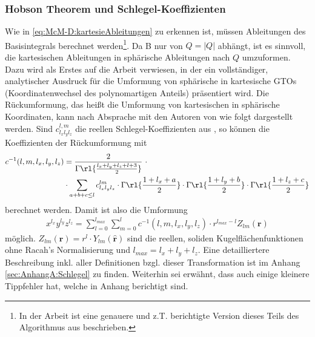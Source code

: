 \subsubsection{Hobson Theorem und 
Schlegel-Koeffizienten}\label{sec:Hobson_schlegel}
%
Wie in \ref{eq:McM-D:kartesieAbleitungen} zu erkennen ist, müssen  
Ableitungen des Basisintegrals berechnet werden\footnote{In der Arbeit 
\cite{av:9a} ist eine genauere und z.T. berichtigte Version dieses Teils des 
Algorithmus aus \cite{av:1a} beschrieben.}. Da B nur von $Q=|Q|$ abhängt, 
ist es sinnvoll, die kartesischen Ableitungen in sphärische Ableitungen nach 
$Q$ umzuformen.\\
Dazu wird als Erstes auf die Arbeit \cite{av:4a} verwiesen, in der ein 
vollständiger, analytischer Ausdruck für die Umformung von sphärische in  
kartesische GTOs (Koordinatenwechsel des polynomartigen Anteils) präsentiert 
wird. Die Rückumformung, das heißt die Umformung von kartesischen in 
sphärische Koordinaten, kann nach Absprache mit den Autoren von \cite{av:1a} 
wie folgt dargestellt werden. Sind $c_{l_xl_yl_z}^{l,m}$ die reellen 
Schlegel-Koeffizienten aus \cite{av:4a}, so können die Koeffizienten der 
Rückumformung mit
%
\begin{align}\nonumber
c^{-1}(l,m,l_x,l_y,l_z)&=\frac{2}{\Gamma\rl{\frac{l_x+l_y+l_z+l+3}{2}}} 
 \ \cdot \\ \label{eq:def:c_koef}
 &\cdot  \sum_{a+b+c\leq l} c_{l_xl_yl_z}^{lm}\cdot 
\Gamma\rl{\frac{1+l_x+a}{2}}\cdot 
\Gamma\rl{\frac{1+l_y+b}{2}}\cdot \Gamma\rl{\frac{1+l_z+c}{2}}
\end{align}
%
berechnet werden. Damit ist also die Umformung
%
\begin{align}\label{eq:trafo_c-1}
x^{l_x}y^{l_y}z^{l_z} = \sum_{l=0}^{l_{max}}\sum_{m=0}^l 
c^{-1}(l,m,l_x,l_y,l_z)\cdot r^{l_{max}-l} Z_{lm}(\textbf{r})
\end{align}
%
möglich. $Z_{lm}(\textbf{r})=r^l\cdot Y_{lm}(\hat{\textbf{r}})$ sind die 
reellen, soliden 
Kugelflächenfunktionen ohne Racah's Normalisierung und 
$l_{max}=l_x+l_y+l_z$. Eine detailliertere Beschreibung inkl. aller 
Definitionen bzgl. dieser Transformation ist im Anhang 
\ref{sec:AnhangA:Schlegel} zu finden. Weiterhin sei erwähnt, 
dass auch 
\cite{av:4a} einige kleinere Tippfehler hat, welche in Anhang berichtigt sind.\\

